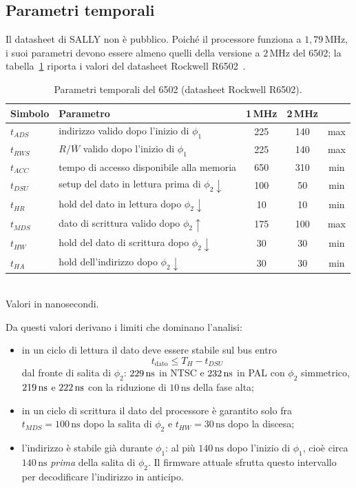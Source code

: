 \documentclass[11pt,a4paper,twoside,openright]{report}
\newcommand{\ns}{\,\mathrm{ns}}
\newcommand{\MHz}{\,\mathrm{MHz}}
\begin{document}
\subsection{Parametri temporali}

Il datasheet di SALLY non è pubblico. Poiché il processore funziona a $1{,}79\MHz$, i suoi
parametri devono essere almeno quelli della versione a $2\MHz$ del 6502; la
tabella~\ref{tab:6502} riporta i valori del datasheet Rockwell R6502~\cite{r6502}.

\begin{table}[htbp]
  \centering
  \caption{Parametri temporali del 6502 (datasheet Rockwell R6502).}
  \label{tab:6502}
  \begin{tabular}{llccc}
    \toprule
    \textbf{Simbolo} & \textbf{Parametro} & \textbf{1\,MHz} & \textbf{2\,MHz} & \\
    \midrule
    $t_{ADS}$  & indirizzo valido dopo l'inizio di $\phi_1$ & 225 & 140 & max \\
    $t_{RWS}$  & $R/\overline{W}$ valido dopo l'inizio di $\phi_1$ & 225 & 140 & max \\
    $t_{ACC}$  & tempo di accesso disponibile alla memoria & 650 & 310 & min \\
    $t_{DSU}$  & setup del dato in lettura prima di $\phi_2\downarrow$ & 100 & 50 & min \\
    $t_{HR}$   & hold del dato in lettura dopo $\phi_2\downarrow$ & 10 & 10 & min \\
    $t_{MDS}$  & dato di scrittura valido dopo $\phi_2\uparrow$ & 175 & 100 & max \\
    $t_{HW}$   & hold del dato di scrittura dopo $\phi_2\downarrow$ & 30 & 30 & min \\
    $t_{HA}$   & hold dell'indirizzo dopo $\phi_2\downarrow$ & 30 & 30 & min \\
    \bottomrule
  \end{tabular}\\[2pt]
  {\footnotesize Valori in nanosecondi.}
\end{table}

Da questi valori derivano i limiti che dominano l'analisi:
\begin{itemize}
  \item in un ciclo di lettura il dato deve essere stabile sul bus entro
        \begin{equation}
          t_{\text{dato}} \le T_H - t_{DSU}
          \label{eq:deadline}
        \end{equation}
        dal fronte di salita di $\phi_2$: $\DLtNTSC\ns$ in NTSC e $\DLtPAL\ns$ in PAL con
        $\phi_2$ simmetrico, $\DLNTSC\ns$ e $\DLPAL\ns$ con la riduzione di $10\ns$
        della fase alta;
  \item in un ciclo di scrittura il dato del processore è garantito solo fra
        $t_{MDS} = 100\ns$ dopo la salita di $\phi_2$ e $t_{HW} = 30\ns$ dopo la discesa;
  \item l'indirizzo è stabile già durante $\phi_1$: al più $140\ns$ dopo l'inizio di
        $\phi_1$, cioè circa $140\ns$ \emph{prima} della salita di $\phi_2$. Il firmware
        attuale sfrutta questo intervallo per decodificare l'indirizzo in anticipo.
\end{itemize}
\end{document}
